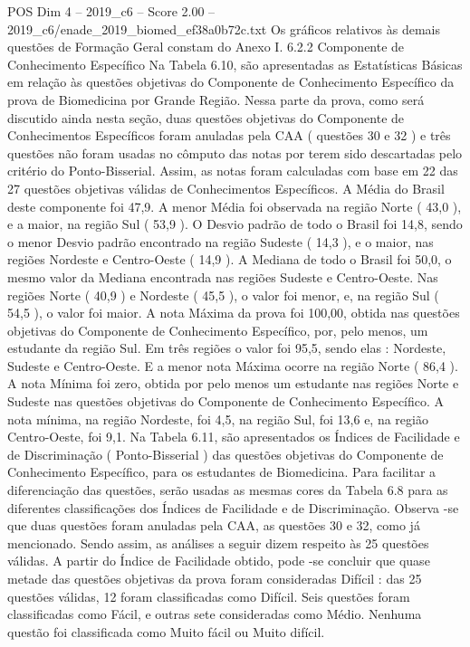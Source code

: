 \begin{textsample}{POS Dim 4 – 2019\_c6 – Score 2.00 – 2019\_c6/enade\_2019\_biomed\_ef38a0b72c.txt}
Os gráficos relativos às demais questões de Formação Geral constam do Anexo I. 6.2.2 Componente de Conhecimento Específico Na Tabela 6.10, são apresentadas as Estatísticas Básicas em relação às questões objetivas do Componente de Conhecimento Específico da prova de Biomedicina por Grande Região.
Nessa parte da prova, como será discutido ainda nesta seção, duas questões objetivas do Componente de Conhecimentos Específicos foram anuladas pela CAA ( questões 30 e 32 ) e três questões não foram usadas no cômputo das notas por terem sido descartadas pelo critério do Ponto-Bisserial.
Assim, as notas foram calculadas com base em 22 das 27 questões objetivas válidas de Conhecimentos Específicos.
A Média do Brasil deste componente foi 47,9.
A menor Média foi observada na região Norte ( 43,0 ), e a maior, na região Sul ( 53,9 ).
O Desvio padrão de todo o Brasil foi 14,8, sendo o menor Desvio padrão encontrado na região Sudeste ( 14,3 ), e o maior, nas regiões Nordeste e Centro-Oeste ( 14,9 ).
A Mediana de todo o Brasil foi 50,0, o mesmo valor da Mediana encontrada nas regiões Sudeste e Centro-Oeste.
Nas regiões Norte ( 40,9 ) e Nordeste ( 45,5 ), o valor foi menor, e, na região Sul ( 54,5 ), o valor foi maior.
A nota Máxima da prova foi 100,00, obtida nas questões objetivas do Componente de Conhecimento Específico, por, pelo menos, um estudante da região Sul.
Em três regiões o valor foi 95,5, sendo elas : Nordeste, Sudeste e Centro-Oeste.
E a menor nota Máxima ocorre na região Norte ( 86,4 ).
A nota Mínima foi zero, obtida por pelo menos um estudante nas regiões Norte e Sudeste nas questões objetivas do Componente de Conhecimento Específico.
A nota mínima, na região Nordeste, foi 4,5, na região Sul, foi 13,6 e, na região Centro-Oeste, foi 9,1.
Na Tabela 6.11, são apresentados os Índices de Facilidade e de Discriminação ( Ponto-Bisserial ) das questões objetivas do Componente de Conhecimento Específico, para os estudantes de Biomedicina.
Para facilitar a diferenciação das questões, serão usadas as mesmas cores da Tabela 6.8 para as diferentes classificações dos Índices de Facilidade e de Discriminação.
Observa -se que duas questões foram anuladas pela CAA, as questões 30 e 32, como já mencionado.
Sendo assim, as análises a seguir dizem respeito às 25 questões válidas.
A partir do Índice de Facilidade obtido, pode -se concluir que quase metade das questões objetivas da prova foram consideradas Difícil : das 25 questões válidas, 12 foram classificadas como Difícil.
Seis questões foram classificadas como Fácil, e outras sete consideradas como Médio.
Nenhuma questão foi classificada como Muito fácil ou Muito difícil.

\end{textsample}
